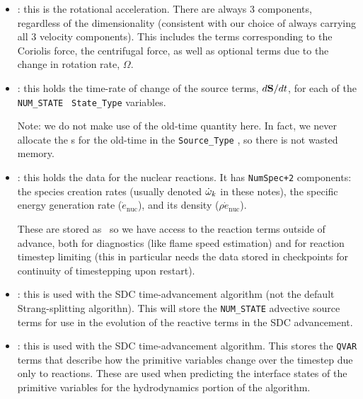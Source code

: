 \begin{itemize}
\item {} : this is the rotational acceleration.
  There are always 3 components, regardless of the dimensionality
  (consistent with our choice of always carrying all 3 velocity
  components).  This includes the terms corresponding to the Coriolis
  force, the centrifugal force, as well as optional terms due to the
  change in rotation rate, $\Omega$.

\item {} : this holds the time-rate of change of
  the source terms, $d{\bf S}/dt$, for each of the {\tt NUM\_STATE} {\tt
    State\_Type} variables.


  Note: we do not make use of the old-time quantity here. In fact, we
  never allocate the \farraybox s for the old-time in the {\tt Source\_Type}
  \statedata, so there is not wasted memory.

\item {} : this holds the data for the nuclear
  reactions.  It has {\tt NumSpec+2} components: the species
  creation rates (usually denoted $\dot\omega_k$ in these notes),
  the specific energy generation rate ($\dot{e}_\mathrm{nuc}$),
  and its density ($\rho \dot{e}_\mathrm{nuc}$).  

  These are stored as \statedata\ so we have access to the reaction terms
  outside of advance, both for diagnostics (like flame speed estimation)
  and for reaction timestep limiting (this in particular needs the 
  data stored in checkpoints for continuity of timestepping upon restart).


\item {} : this is used with the SDC
  time-advancement algorithm (not the default Strang-splitting
  algorithn).  This will store the {\tt NUM\_STATE} advective source
  terms for use in the evolution of the reactive terms in the SDC
  advancement.

\item {} : this is used with the SDC
  time-advancement algorithm.  This stores the {\tt QVAR} terms
  that describe how the primitive variables change over the timestep
  due only to reactions.  These are used when predicting the interface
  states of the primitive variables for the hydrodynamics portion of the
  algorithm.

\end{itemize}


